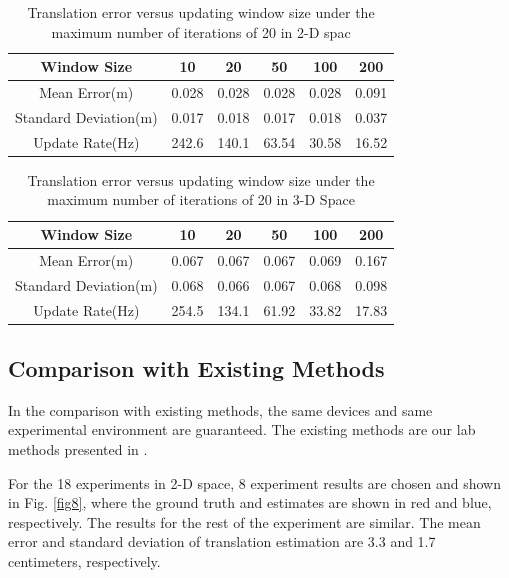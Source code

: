 \documentclass[journal]{IEEEtran}
\begin{document}
\begin{table}[ht!]
  \begin{center}
  \caption{Translation error versus updating window size under the maximum number of iterations of 20 in 2-D spac}
  \label{errortable1}
        \begin{tabular}{c|c|c|c|c|c}
        \hline\hline
         Window Size& 10  &20 &  50  & 100 &200\\
        \hline
         Mean Error(m) &0.028 &0.028 & 0.028 &  0.028 &0.091 \\
        Standard Deviation(m)&0.017 &0.018  & 0.017 &  0.018 & 0.037 \\
        Update Rate(Hz)&242.6 &140.1 & 63.54 &  30.58 &16.52 \\
        \hline\hline
        \end{tabular}
  \end{center}
\end{table}

\begin{table}[ht!]
  \begin{center}
  \caption{Translation error versus updating window size under the maximum number of iterations of 20 in 3-D Space}
  \label{errortable}
        \begin{tabular}{c|c|c|c|c|c}
        \hline\hline
         Window Size& 10  &20 &  50  & 100 &200\\
        \hline
         Mean Error(m) &0.067 &0.067 & 0.067 &  0.069 &0.167 \\
        Standard Deviation(m)&0.068 &0.066  & 0.067 &  0.068 & 0.098 \\
        Update Rate(Hz)&254.5 &134.1 & 61.92 &  33.82 &17.83 \\
        \hline\hline
        \end{tabular}
  \end{center}
\end{table}

\subsection{Comparison with Existing Methods}

In the comparison with existing methods, the same devices and same experimental environment are guaranteed. The existing methods are our lab methods presented in \cite{Guo:2016ff,Anonymous:tWWRLPVI}.


For the 18 experiments in 2-D space, 8 experiment results are chosen and shown in Fig. \ref{fig8}, where the ground truth and estimates are shown in red and blue, respectively. The results for the rest of the experiment are similar. The mean error and standard deviation of translation estimation are 3.3 and 1.7 centimeters, respectively.  
\end{document}
